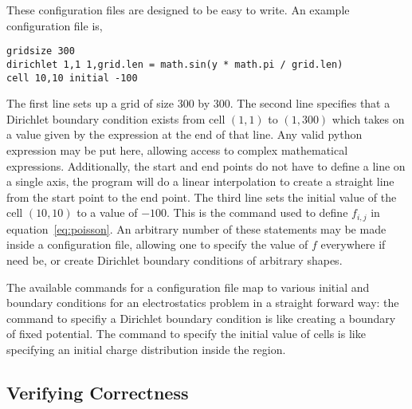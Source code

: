 These configuration files are designed to be easy to write. An example configuration file is,
\begin{addmargin}[4em]{2em}
\begin{singlespace}
\texttt{gridsize 300}\\
\texttt{dirichlet 1,1 1,grid.len = math.sin(y * math.pi / grid.len)}\\
\texttt{cell 10,10 initial -100}
\end{singlespace}
\end{addmargin}
The first line sets up a grid of size 300 by 300. The second line specifies that a Dirichlet boundary condition exists
from cell $(1, 1)$ to $(1, 300)$ which takes on a value given by the expression at the end of that line. Any valid python
expression may be put here, allowing access to complex mathematical expressions. Additionally, the start and end points
do not have to define a line on a single axis, the program will do a linear interpolation to create a straight line from
	the start point to the end point.
The third line sets the initial value of
the cell $(10, 10)$ to a value of $-100$. This is the command used to define $f_{i,j}$ in equation~\ref{eq:poisson}.
An arbitrary number of these statements may be made inside a configuration file, allowing one to specify the value of
$f$ everywhere if need be, or create Dirichlet boundary conditions of arbitrary shapes.

The available commands for a configuration file map to various initial and boundary conditions for an electrostatics problem
in a straight forward way: the command to specifiy a Dirichlet boundary condition is like creating a boundary of fixed potential.
The command to specify the initial value of cells is like specifying an initial charge distribution inside the region.












\subsection{Verifying Correctness}

